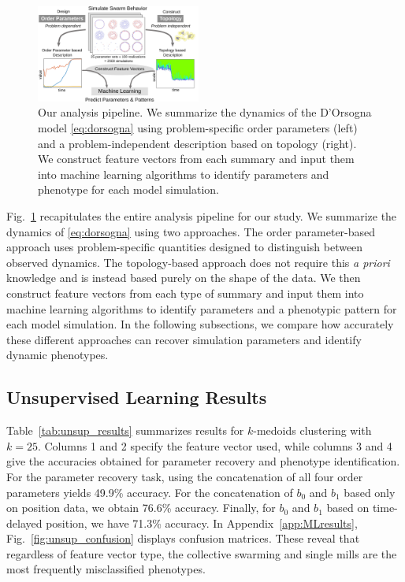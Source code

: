 \documentclass[%
 aip,
reprint,
 amsmath,amssymb,
 aps,
showkeys
]{revtex4-1}
\begin{document}
\begin{figure}[h!]
    \centering
    \includegraphics[width=0.48\textwidth]{overview2.pdf}
    \caption{Our analysis pipeline. We summarize the dynamics of the D'Orsogna model \eqref{eq:dorsogna} using problem-specific order parameters (left) and a problem-independent description based on topology (right). We construct feature vectors from each summary and input them into machine learning algorithms to identify parameters and phenotype for each model simulation.}
    \label{fig:graphSummary}
\end{figure}

 Fig.~\ref{fig:graphSummary} recapitulates the entire analysis pipeline for our study. We summarize the dynamics of \eqref{eq:dorsogna} using two approaches. The order parameter-based approach uses problem-specific quantities designed to distinguish between observed dynamics. The topology-based approach does not require this \emph{a priori} knowledge and is instead based purely on the shape of the data. We then construct feature vectors from each type of summary and input them into machine learning algorithms to identify parameters and a phenotypic pattern for each model simulation. In the following subsections, we compare how accurately these different approaches can recover simulation parameters and identify dynamic phenotypes.

\subsection{Unsupervised Learning Results\label{sec:unsupervised}}

Table~\ref{tab:unsup_results} summarizes results for $k$-medoids clustering with $k=25$. Columns 1 and 2 specify the feature vector used, while columns 3 and 4 give the accuracies obtained for parameter recovery and phenotype identification. For the parameter recovery task, using the concatenation of all four order parameters yields 49.9\% accuracy. For the concatenation of $b_0$ and $b_1$ based only on position data, we obtain 76.6\% accuracy. Finally, for $b_0$ and $b_1$ based on time-delayed position, we have 71.3\% accuracy. In Appendix~\ref{app:MLresults}, Fig.~\ref{fig:unsup_confusion} displays confusion matrices. These reveal that regardless of feature vector type, the collective swarming and single mills are the most frequently misclassified phenotypes.
\end{document}
